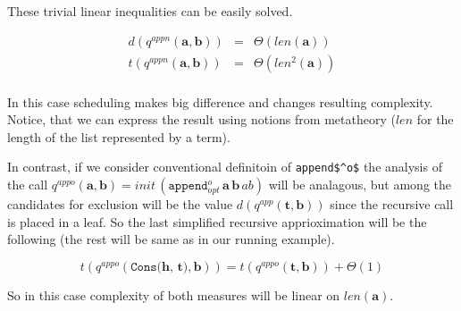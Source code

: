 These trivial linear inequalities can be easily solved.

\[
\begin{array}{lcl}
d(q^{appn}(\mathbf{a}, \mathbf{b})) & = & \Theta(len(\mathbf{a})) \\
t(q^{appn}(\mathbf{a}, \mathbf{b})) & = & \Theta(len^2(\mathbf{a})) \\
\end{array}
 \]
 
In this case scheduling makes big difference and changes resulting complexity. Notice, that we can express the result using notions from metatheory ($len$ for the length of the list represented by a term).

In contrast, if we consider conventional definitoin of \lstinline|append$^o$| the analysis of the call $q^{appo}(\mathbf{a}, \mathbf{b}) = init\,(\texttt{append$^o_{opt}$} \, \mathbf{a} \, \mathbf{b} \, ab)$ will be analagous, but among the candidates for exclusion will be the value $d(q^{app}(\mathbf{t}, \mathbf{b}))$ since the recursive call is placed in a leaf. So the last simplified recursive apprioximation will be the following (the rest will be same as in our running example).

\[ t(q^{appo}(\texttt{Cons($\mathbf{h}$, $\mathbf{t}$)}, \mathbf{b})) = t(q^{appo}(\mathbf{t}, \mathbf{b})) + \Theta(1) \]

So in this case complexity of both measures will be linear on $len(\mathbf{a})$.
